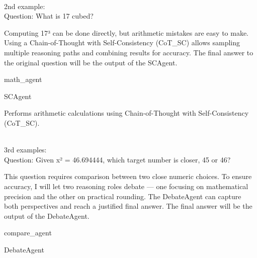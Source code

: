 \begin{userprompt}[title={User Prompt}]
\quad{}

\\

2nd example:\\

Question: What is 17 cubed?\\


Computing 17³ can be done directly, but arithmetic mistakes are easy to make.
Using a Chain-of-Thought with Self-Consistency (CoT\_SC) allows sampling multiple reasoning paths and combining results for accuracy.
The final answer to the original question will be the output of the SCAgent.



\quad{}math\_agent

\quad{}SCAgent

\quad{}
Performs arithmetic calculations using Chain-of-Thought with Self-Consistency (CoT\_SC).

\quad{}

\qquad{}

\quad{}

 \\

3rd examples: \\

Question: Given x² = 46.694444, which target number is closer, 45 or 46? \\


This question requires comparison between two close numeric choices.
To ensure accuracy, I will let two reasoning roles debate — one focusing on mathematical precision and the other on practical rounding.
The DebateAgent can capture both perspectives and reach a justified final answer.
The final answer will be the output of the DebateAgent.



\quad{}compare\_agent

\quad{}DebateAgent


\end{userprompt}
